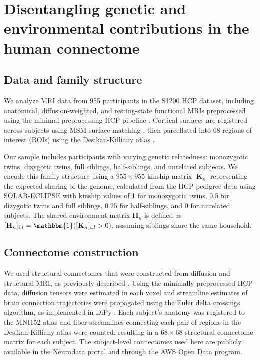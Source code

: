 \documentclass[12pt]{article}
\DeclareMathOperator{\K}{\mathbf{K}}
\begin{document}
\section{Disentangling genetic and environmental contributions in the human connectome} \label{sec:application}
\vspace{-3.5mm}
\subsection{Data and family structure}

We analyze MRI data from 955 participants in the S1200 HCP dataset, including anatomical, diffusion-weighted, and resting-state functional MRIs preprocessed using the minimal preprocessing HCP pipeline \parencite{glasser2013minimal}. Cortical surfaces are registered across subjects using MSM surface matching \parencite{robinson2014msm}, then parcellated into 68 regions of interest (ROIs) using the Desikan-Killiany atlas \parencite{desikan2006automated}.


Our sample includes participants with varying genetic relatedness: monozygotic twins, dizygotic twins,  full siblings, half-siblings, and unrelated subjects. We encode this family structure using a $955 \times 955$ kinship matrix $\K_n$ representing the expected sharing of the genome, calculated from the HCP pedigree data using SOLAR-ECLIPSE \parencite{koran2014study} with kinship values of 1 for monozygotic twins, 0.5 for dizygotic twins and full siblings, 0.25 for half-siblings, and 0 for unrelated subjects. The shared environment matrix $\mathbf{H}_n$ is defined as $[\mathbf{H}_n]_{i, l} = \mathbbm{1}([\mathbf{K}_n]_{i, l} > 0)$, assuming siblings share the same household.

\vspace{-3.5mm}
\subsection{Connectome construction}

We used structural connectomes that were constructed from diffusion and structural MRI, as previously described \parencite{kiar2017highthroughput}. Using the minimally preprocessed HCP data, diffusion tensors were estimated in each voxel and streamline estimates of brain connection trajectories were propagated using the Euler delta crossings algorithm, as implemented in DiPy \parencite{garyfallidis2014dipy}. Each subject's anatomy was registered to the MNI152 atlas and fiber streamlines connecting each pair of regions in the Desikan-Killiany atlas were counted, resulting in a $68 \times 68$ structural connectome matrix for each subject. The subject-level connectomes used here are publicly available in the Neurodata portal \parencite{vogelstein2018communitydeveloped} and through the AWS Open Data program.
\end{document}
